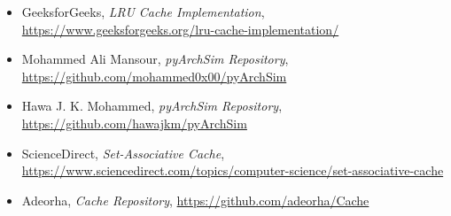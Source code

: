 \documentclass[12pt,a4paper]{report}
\begin{document}
\begin{itemize}
  \item GeeksforGeeks, \textit{LRU Cache Implementation}, \url{https://www.geeksforgeeks.org/lru-cache-implementation/}
  \item Mohammed Ali Mansour, \textit{pyArchSim Repository}, \url{https://github.com/mohammed0x00/pyArchSim}
  \item Hawa J. K. Mohammed, \textit{pyArchSim Repository}, \url{https://github.com/hawajkm/pyArchSim}
  \item ScienceDirect, \textit{Set-Associative Cache}, \url{https://www.sciencedirect.com/topics/computer-science/set-associative-cache}
  \item Adeorha, \textit{Cache Repository}, \url{https://github.com/adeorha/Cache}
\end{itemize}
\end{document}
